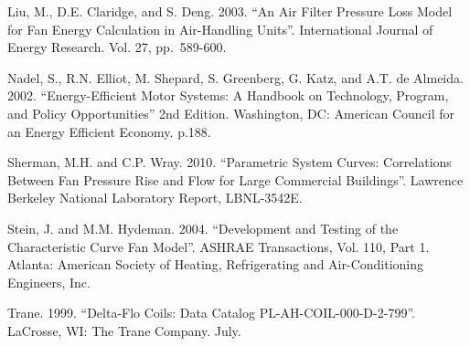 Liu, M., D.E. Claridge, and S. Deng. 2003. ``An Air Filter Pressure Loss Model for Fan Energy Calculation in Air-Handling Units''. International Journal of Energy Research. Vol. 27, pp.~589-600.

Nadel, S., R.N. Elliot, M. Shepard, S. Greenberg, G. Katz, and A.T. de Almeida. 2002. ``Energy-Efficient Motor Systems: A Handbook on Technology, Program, and Policy Opportunities'' 2nd Edition. Washington, DC: American Council for an Energy Efficient Economy. p.188.

Sherman, M.H. and C.P. Wray. 2010. ``Parametric System Curves: Correlations Between Fan Pressure Rise and Flow for Large Commercial Buildings''. Lawrence Berkeley National Laboratory Report, LBNL-3542E.

Stein, J. and M.M. Hydeman. 2004. ``Development and Testing of the Characteristic Curve Fan Model''. ASHRAE Transactions, Vol. 110, Part 1. Atlanta: American Society of Heating, Refrigerating and Air-Conditioning Engineers, Inc.

Trane. 1999. ``Delta-Flo Coils: Data Catalog PL-AH-COIL-000-D-2-799''. LaCrosse, WI: The Trane Company. July.
